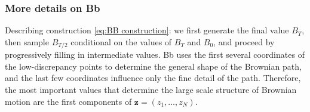\subsubsection{More details on Bb}

Describing construction \ref{eq:BB construction}: we  first generate the final value $B_T$, then sample $B_{T/2}$ conditional
on the values of $B_T$ and $B_0$, and proceed by progressively filling in intermediate values. Bb uses the first several coordinates of the low-discrepancy points to determine the general shape of the Brownian path, and the last few coordinates influence only the fine detail of the path. Therefore, the most important values that determine the large scale structure of Brownian motion are the first components of $\mathbf{z} = (z_1,\dots,z_N)$.  
